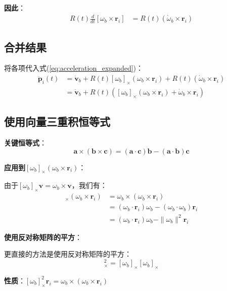 \documentclass[12pt,a4paper]{article}
\begin{document}
\textbf{因此}：
\begin{align}
R(t) \frac{d}{dt}[\omega_b \times \bm{r}_i] &= R(t) (\dot{\omega}_b \times \bm{r}_i)
\end{align}

\subsection{合并结果}

将各项代入式(\ref{eq:acceleration_expanded})：
\begin{align}
\ddot{\bm{p}}_i(t) &= \dot{\bm{v}}_b + R(t) [\omega_b]_{\times} (\omega_b \times \bm{r}_i) + R(t) (\dot{\omega}_b \times \bm{r}_i) \\
&= \dot{\bm{v}}_b + R(t) \left([\omega_b]_{\times} (\omega_b \times \bm{r}_i) + \dot{\omega}_b \times \bm{r}_i\right)
\label{eq:acceleration_intermediate}
\end{align}

\subsection{使用向量三重积恒等式}

\textbf{关键恒等式}：
\begin{equation}
\bm{a} \times (\bm{b} \times \bm{c}) = (\bm{a} \cdot \bm{c}) \bm{b} - (\bm{a} \cdot \bm{b}) \bm{c}
\end{equation}

\textbf{应用到$[\omega_b]_{\times} (\omega_b \times \bm{r}_i)$}：

由于$[\omega_b]_{\times} \bm{v} = \omega_b \times \bm{v}$，我们有：
\begin{align}
[\omega_b]_{\times} (\omega_b \times \bm{r}_i) &= \omega_b \times (\omega_b \times \bm{r}_i) \\
&= (\omega_b \cdot \bm{r}_i) \omega_b - (\omega_b \cdot \omega_b) \bm{r}_i \\
&= (\omega_b \cdot \bm{r}_i) \omega_b - \|\omega_b\|^2 \bm{r}_i
\end{align}

\textbf{使用反对称矩阵的平方}：

更直接的方法是使用反对称矩阵的平方：
\begin{equation}
[\omega_b]_{\times}^2 = [\omega_b]_{\times} [\omega_b]_{\times}
\end{equation}

\textbf{性质}：$[\omega_b]_{\times}^2 \bm{r}_i = \omega_b \times (\omega_b \times \bm{r}_i)$
\end{document}

